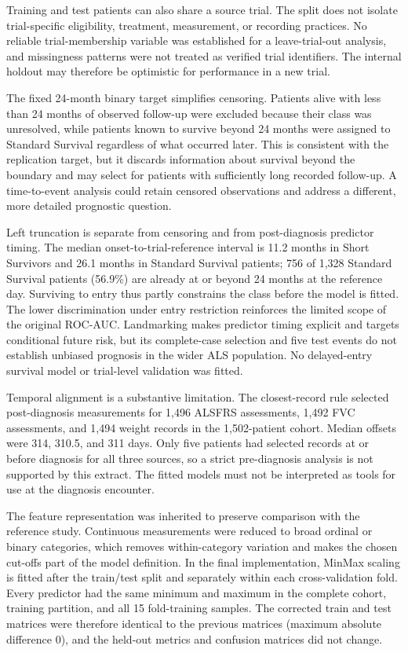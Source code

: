 Training and test patients can also share a source trial. The split does not isolate trial-specific eligibility, treatment, measurement, or recording practices. No reliable trial-membership variable was established for a leave-trial-out analysis, and missingness patterns were not treated as verified trial identifiers. The internal holdout may therefore be optimistic for performance in a new trial.

The fixed 24-month binary target simplifies censoring. Patients alive with less than 24 months of observed follow-up were excluded because their class was unresolved, while patients known to survive beyond 24 months were assigned to Standard Survival regardless of what occurred later. This is consistent with the replication target, but it discards information about survival beyond the boundary and may select for patients with sufficiently long recorded follow-up. A time-to-event analysis could retain censored observations and address a different, more detailed prognostic question.

Left truncation is separate from censoring and from post-diagnosis predictor timing. The median onset-to-trial-reference interval is 11.2 months in Short Survivors and 26.1 months in Standard Survival patients; 756 of 1,328 Standard Survival patients (56.9\%) are already at or beyond 24 months at the reference day. Surviving to entry thus partly constrains the class before the model is fitted. The lower discrimination under entry restriction reinforces the limited scope of the original ROC-AUC. Landmarking makes predictor timing explicit and targets conditional future risk, but its complete-case selection and five test events do not establish unbiased prognosis in the wider ALS population. No delayed-entry survival model or trial-level validation was fitted.

Temporal alignment is a substantive limitation. The closest-record rule selected post-diagnosis measurements for 1,496 ALSFRS assessments, 1,492 FVC assessments, and 1,494 weight records in the 1,502-patient cohort. Median offsets were 314, 310.5, and 311 days. Only five patients had selected records at or before diagnosis for all three sources, so a strict pre-diagnosis analysis is not supported by this extract. The fitted models must not be interpreted as tools for use at the diagnosis encounter.

The feature representation was inherited to preserve comparison with the reference study. Continuous measurements were reduced to broad ordinal or binary categories, which removes within-category variation and makes the chosen cut-offs part of the model definition. In the final implementation, MinMax scaling is fitted after the train/test split and separately within each cross-validation fold. Every predictor had the same minimum and maximum in the complete cohort, training partition, and all 15 fold-training samples. The corrected train and test matrices were therefore identical to the previous matrices (maximum absolute difference 0), and the held-out metrics and confusion matrices did not change.

